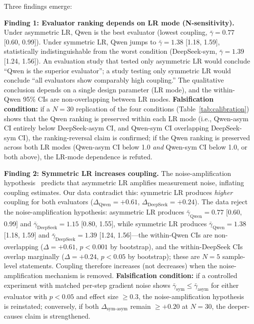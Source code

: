 \documentclass[11pt]{article}
\begin{document}
Three findings emerge:

\textbf{Finding 1: Evaluator ranking depends on LR mode (N-sensitivity).} Under asymmetric LR, Qwen is the best evaluator (lowest coupling, $\bar{\gamma}{=}0.77$ [0.60, 0.99]). Under symmetric LR, Qwen jumps to $\bar{\gamma}{=}1.38$ [1.18, 1.59], statistically indistinguishable from the worst condition (DeepSeek-sym, $\bar{\gamma}{=}1.39$ [1.24, 1.56]). An evaluation study that tested only asymmetric LR would conclude ``Qwen is the superior evaluator''; a study testing only symmetric LR would conclude ``all evaluators show comparably high coupling.'' The qualitative conclusion depends on a single design parameter (LR mode), and the within-Qwen 95\% CIs are non-overlapping between LR modes. \textbf{Falsification condition:} if a $N{=}30$ replication of the four conditions (Table~\ref{tab:calibration}) shows that the Qwen ranking is preserved within each LR mode (i.e., Qwen-asym CI entirely below DeepSeek-asym CI, and Qwen-sym CI overlapping DeepSeek-sym CI), the ranking-reversal claim is confirmed; if the Qwen ranking is preserved across both LR modes (Qwen-asym CI below 1.0 \emph{and} Qwen-sym CI below 1.0, or both above), the LR-mode dependence is refuted.

\textbf{Finding 2: Symmetric LR increases coupling.} The noise-amplification hypothesis~\cite{liu2026noise} predicts that asymmetric LR amplifies measurement noise, inflating coupling estimates. Our data contradict this: symmetric LR produces \emph{higher} coupling for both evaluators ($\Delta_{\text{Qwen}}{=}{+}0.61$, $\Delta_{\text{DeepSeek}}{=}{+}0.24$). The data reject the noise-amplification hypothesis: asymmetric LR produces $\bar{\gamma}_{\text{Qwen}}{=}0.77$ [0.60, 0.99] and $\bar{\gamma}_{\text{DeepSeek}}{=}1.15$ [0.80, 1.55], while symmetric LR produces $\bar{\gamma}_{\text{Qwen}}{=}1.38$ [1.18, 1.59] and $\bar{\gamma}_{\text{DeepSeek}}{=}1.39$ [1.24, 1.56]---the within-Qwen CIs are non-overlapping ($\Delta{=}{+}0.61$, $p<0.001$ by bootstrap), and the within-DeepSeek CIs overlap marginally ($\Delta{=}{+}0.24$, $p<0.05$ by bootstrap); these are $N{=}5$ sample-level statements. Coupling therefore increases (not decreases) when the noise-amplification mechanism is removed. \textbf{Falsification condition:} if a controlled experiment with matched per-step gradient noise shows $\bar{\gamma}_{\text{sym}} \leq \bar{\gamma}_{\text{asym}}$ for either evaluator with $p<0.05$ and effect size $\geq 0.3$, the noise-amplification hypothesis is reinstated; conversely, if both $\Delta_{\text{sym-asym}}$ remain $\geq +0.20$ at $N{=}30$, the deeper-causes claim is strengthened.
\end{document}
